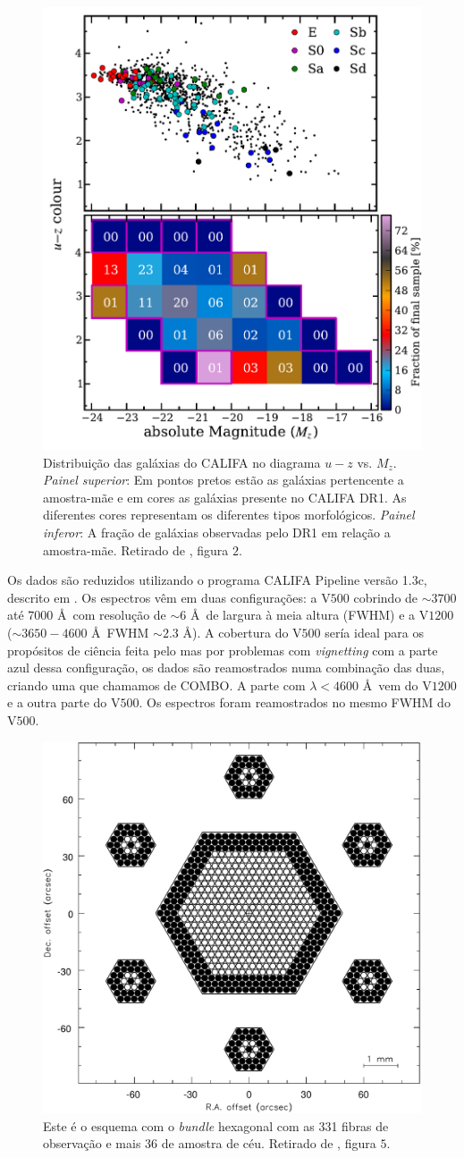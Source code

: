 \begin{figure}
    \includegraphics[height=0.5\textwidth]{figuras/figHusemann2013Fig2.pdf}
    \caption[Diagrama cor-magnitude para as galáxias do CALIFA.]
    {Distribui\c{c}\~ao das galáxias do CALIFA no diagrama $u-z$ vs. $M_z$. 
    {\em Painel superior}: Em pontos pretos est\~ao as galáxias pertencente a
    amostra-m\~ae e em cores as galáxias presente no CALIFA DR1. As diferentes
    cores representam os diferentes tipos morfológicos. {\em Painel inferor}: A
    fra\c{c}\~ao de galáxias observadas pelo DR1 em rela\c{c}\~ao a
    amostra-m\~ae. Retirado de \citet{Husemann2013}, figura $2$.}
    \label{fig:cm-uzMz}
\end{figure}

Os dados são reduzidos utilizando o programa CALIFA Pipeline versão 1.3c,
descrito em \citet{Husemann2013}. Os espectros vêm em duas configurações: a
V$500$ cobrindo de $\sim3700$ até $7000$ \AA\ com resolução de $\sim6$ \AA\ 
de largura à meia altura (FWHM) e a V$1200$ ($\sim3650-4600$ \AA\  FWHM
$\sim2.3$ \AA). A cobertura do V$500$ sería ideal para os propósitos de ciência feita pelo
\starlight mas por problemas com {\em vignetting} com a parte azul dessa
configuração, os dados são reamostrados numa combinação das duas, criando uma
que chamamos de COMBO. A parte com $\lambda < 4600$ \AA\  vem do V$1200$ e a
outra parte do V$500$. Os espectros foram reamostrados no mesmo FWHM do V$500$.

\begin{figure}
    \includegraphics[height=0.5\textwidth]{figuras/figVerheijen2004Fig5.pdf}
    \caption[Configura\c{c}\~ao do {\em bundle} de fibras do PPMAS/PPAK.]
    {Este é o esquema com o {\em bundle} hexagonal com as 331 fibras de
    observação e mais 36 de amostra de céu. Retirado de \citet{Verheijen2004},
    figura $5$.}
    \label{fig:BundlePPAK}
\end{figure}

